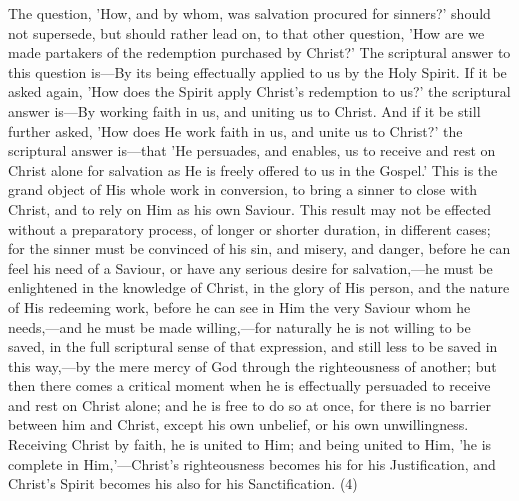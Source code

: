\documentclass[
]{book}
\begin{document}
The question, 'How, and by whom, was salvation procured for sinners?' should not supersede, but should rather lead on, to that other question, 'How are we made partakers of the redemption purchased by Christ?' The scriptural answer to this question is---By its being effectually applied to us by the Holy Spirit. If it be asked again, 'How does the Spirit apply Christ's redemption to us?' the scriptural answer is---By working faith in us, and uniting us to Christ. And if it be still further asked, 'How does He work faith in us, and unite us to Christ?' the scriptural answer is---that 'He persuades, and enables, us to receive and rest on Christ alone for salvation as He is freely offered to us in the Gospel.' This is the grand object of His whole work in conversion, to bring a sinner to close with Christ, and to rely on Him as his own Saviour. This result may not be effected without a preparatory process, of longer or shorter duration, in different cases; for the sinner must be convinced of his sin, and misery, and danger, before he can feel his need of a Saviour, or have any serious desire for salvation,---he must be enlightened in the knowledge of Christ, in the glory of His person, and the nature of His redeeming work, before he can see in Him the very Saviour whom he needs,---and he must be made willing,---for naturally he is not willing to be saved, in the full scriptural sense of that expression, and still less to be saved in this way,---by the mere mercy of God through the righteousness of another; but then there comes a critical moment when he is effectually persuaded to receive and rest on Christ alone; and he is free to do so at once, for there is no barrier between him and Christ, except his own unbelief, or his own unwillingness. Receiving Christ by faith, he is united to Him; and being united to Him, 'he is complete in Him,'---Christ's righteousness becomes his for his Justification, and Christ's Spirit becomes his also for his Sanctification. (4)
\end{document}
